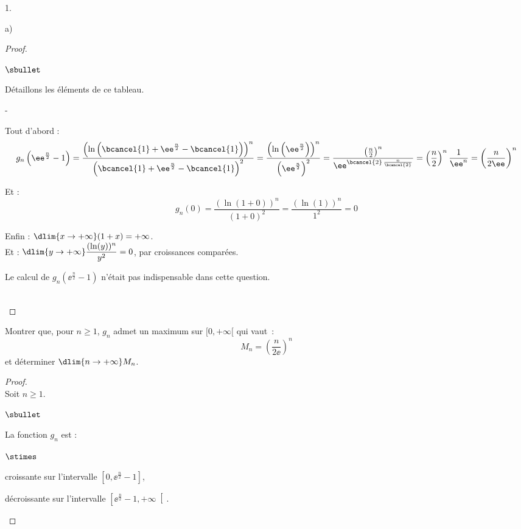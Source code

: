 \documentclass[11pt]{article}%
\begin{document}
\begin{noliste}{1.}
\begin{noliste}{a)}
\begin{proof}
\begin{noliste}{$\sbullet$}
   \item Détaillons les éléments de ce tableau.
     \begin{noliste}{-}
     \item Tout d'abord : 
       \[
       g_n\left(\ee^{\frac{n}{2}}-1\right) =
       \dfrac{\left(\ln\left(\bcancel{1} +
             \ee^{\frac{n}{2}}-\bcancel{1}\right)\right)^n}
       {\left(\bcancel{1}+\ee^{\frac{n}{2}}-\bcancel{1}\right)^2} =
       \dfrac{\left(\ln\left(\ee^{\frac{n}{2}} \right)\right)^n}
       {\left(\ee^{\frac{n}{2}}\right)^2} =
       \dfrac{\left(\frac{n}{2}\right)^n}{\ee^{\bcancel{2}\,
           \frac{n}{\bcancel{2}}}} = \left(\dfrac{n}{2}\right)^n
       \dfrac{1}{\ee^n} =\left(\dfrac{n}{2\ee}\right)^n
       \]
       
    
       \newpage
    
    
    \item Et :
    \[
     g_n(0) = \dfrac{\left(\ln(1+0)\right)^n}{(1+0)^2}
     = \dfrac{\left(\ln(1)\right)^n}{1^2}=0
    \]
    
  \item Enfin : $\dlim{x\to+\infty} (1+x)=+\infty$.\\[.2cm]
    Et : $\dlim{y\to +\infty} \dfrac{(\ln(y))^n}{y^2}=0$, par
    croissances comparées. %
  \end{noliste}
 \end{noliste}
 \begin{remarkL}{.75}
   Le calcul de $g_n\left(\ee^{\frac{n}{2}}-1\right)$ n'était pas
   indispensable dans cette question.
 \end{remarkL}~\\[-1.4cm]
\end{proof}


\item Montrer que, pour $n \geq 1$, $g_n$ admet un maximum sur 
$[0,+\infty[$ qui vaut~:
\[ 
M_n = \left( \dfrac{n}{2 \ee} \right)^n 
\]
et déterminer $\dlim{n \to + \infty} M_n$.

\begin{proof}~\\
 Soit $n\geq 1$.
 \begin{noliste}{$\sbullet$}
  \item La fonction $g_n$ est :
  \begin{noliste}{$\stimes$}
    \item croissante sur l'intervalle $\left[0, \ee^{\frac{n}{2}}-1
    \right]$,
    \item décroissante sur l'intervalle $\left[ \ee^{\frac{n}{2}} -1,
    +\infty \right[$.
  \end{noliste}
  \conc{Sur $[0,+\infty[$, La fonction $g_n$ admet un maximum $M_n$ en 
  $\ee^{\frac{n}{2}}-1$ et,\\[.2cm]
  d'après la question \itbf{1.b)}, $M_n=\left(\dfrac{n}{2\ee}\right)^n$}
  

\end{noliste}
\end{proof}
\end{noliste}
\end{noliste}
\end{document}
